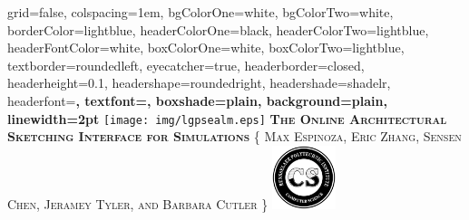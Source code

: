 \documentclass[landscape,final,a0paper,fontscale=0.285]{baposter}
\begin{document}
\begin{poster}%
  {
  grid=false,
  colspacing=1em,
  bgColorOne=white,
  bgColorTwo=white,
  borderColor=lightblue,
  headerColorOne=black,
  headerColorTwo=lightblue,
  headerFontColor=white,
  boxColorOne=white,
  boxColorTwo=lightblue,
  textborder=roundedleft,
  eyecatcher=true,
  headerborder=closed,
  headerheight=0.1\textheight,
  headershape=roundedright,
  headershade=shadelr,
  headerfont=\Large\bf\textsc, %
  textfont={\setlength{\parindent}{1.5em}},
  boxshade=plain,
  background=plain,
  linewidth=2pt
  }
  {\texttt{[image: img/lgpsealm.eps]}}
  {\bf\textsc{The Online Architectural Sketching Interface for Simulations }\vspace{0.5em}}
  {\textsc{\{ Max Espinoza, Eric Zhang, Sensen Chen, Jeramey Tyler, and Barbara Cutler \}}}
  {%
    \includegraphics[height=5.0em]{img/logo_cs_design_1.png}
  }

    \newcommand{\colouredcircle}{%
      \tikz{\useasboundingbox (-0.2em,-0.32em) rectangle(0.2em,0.32em); \draw[draw=black,fill=lightblue,line width=0.03em] (0,0) circle(0.18em);}}

\end{poster}
\end{document}
